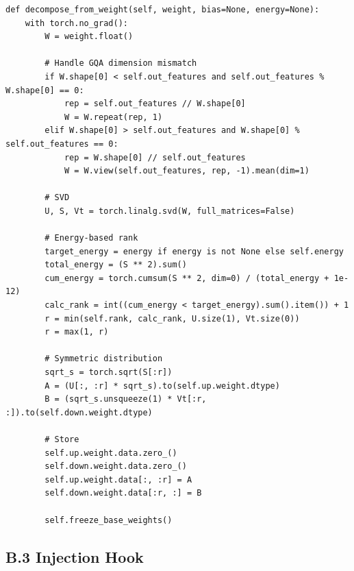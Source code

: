 \begin{lstlisting}
def decompose_from_weight(self, weight, bias=None, energy=None):
    with torch.no_grad():
        W = weight.float()
        
        # Handle GQA dimension mismatch
        if W.shape[0] < self.out_features and self.out_features % W.shape[0] == 0:
            rep = self.out_features // W.shape[0]
            W = W.repeat(rep, 1)
        elif W.shape[0] > self.out_features and W.shape[0] % self.out_features == 0:
            rep = W.shape[0] // self.out_features
            W = W.view(self.out_features, rep, -1).mean(dim=1)
        
        # SVD
        U, S, Vt = torch.linalg.svd(W, full_matrices=False)
        
        # Energy-based rank
        target_energy = energy if energy is not None else self.energy
        total_energy = (S ** 2).sum()
        cum_energy = torch.cumsum(S ** 2, dim=0) / (total_energy + 1e-12)
        calc_rank = int((cum_energy < target_energy).sum().item()) + 1
        r = min(self.rank, calc_rank, U.size(1), Vt.size(0))
        r = max(1, r)
        
        # Symmetric distribution
        sqrt_s = torch.sqrt(S[:r])
        A = (U[:, :r] * sqrt_s).to(self.up.weight.dtype)
        B = (sqrt_s.unsqueeze(1) * Vt[:r, :]).to(self.down.weight.dtype)
        
        # Store
        self.up.weight.data.zero_()
        self.down.weight.data.zero_()
        self.up.weight.data[:, :r] = A
        self.down.weight.data[:r, :] = B
        
        self.freeze_base_weights()
\end{lstlisting}

\subsection{B.3 Injection Hook}

